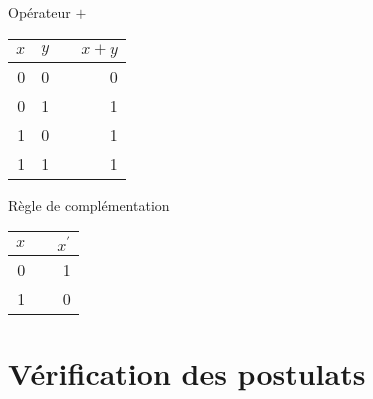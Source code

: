 \documentclass[letter, oneside]{book}
\begin{document}
Opérateur \(+\)

\begin{center}
\begin{tabular}{rrlr}
\(x\) & \(y\) &  & \(x + y\)\\[0pt]
\hline
0 & 0 &  & 0\\[0pt]
0 & 1 &  & 1\\[0pt]
1 & 0 &  & 1\\[0pt]
1 & 1 &  & 1\\[0pt]
\end{tabular}
\end{center}

Règle de complémentation

\begin{center}
\begin{tabular}{rlr}
\(x\) &  & \(x^{\prime}\)\\[0pt]
\hline
0 &  & 1\\[0pt]
1 &  & 0\\[0pt]
\end{tabular}
\end{center}


\section{Vérification des postulats}
\label{sec:orgfd7039a}
\end{document}
